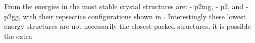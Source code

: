 From the energies in  the most stable crystal structures are: \sone{} - p2mg, \scon{} - p2, and \tri{} - p2gg, with their repsectice configurations shown in . Interestingly these lowest energy structures are not necessarily the closest packed structures, it is possible the extra 

\begin{figure}
    \centering
    \begin{subfigure}[t]{0.5\linewidth}
        \caption{}
        \label{fig:crystal sone}
    \end{subfigure}
    \begin{subfigure}[t]{0.5\linewidth}%
        \caption{}
        \label{fig:crystal sone}
    \end{subfigure}
    \begin{subfigure}{0.5\linewidth}
        \caption{}
        \label{fig:crystal sone}
    \end{subfigure}
    \caption{}
    \label{fig:crystals}
\end{figure}


